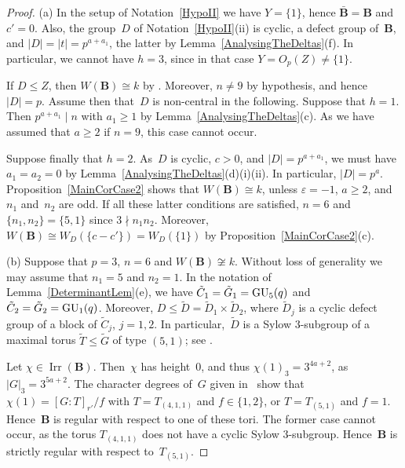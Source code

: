 \documentclass[12pt]{amsart}
\newcommand{\bB}{{\mathbf{B}}}
\def\GU{ \text{\rm GU} }
\DeclareMathOperator{\Irr}{Irr}
\theoremstyle{theorem}
\theoremstyle{definition}
\theoremstyle{remark}
\begin{document}
\begin{proof}
(a) In the setup of Notation~\ref{HypoII} we have $Y = \{ 1 \}$, hence
$\bar{\bB} = \bB$ and  $c' = 0$. Also, the group~$D$ of 
Notation~\ref{HypoII}(ii) is cyclic, a defect group of~$\bB$, and 
$|D| = |t| = p^{a+a_1}$, the latter by Lemma~\ref{AnalysingTheDeltas}(f). 
In particular, we cannot have $h = 3$, since in that case $Y = O_p( Z ) 
\neq \{ 1 \}$.

If $D \leq Z$, then $W( \bB ) \cong k$ by \cite[Lemma~$3.6$(b)]{HL24}. 
Moreover, $n \neq 9$ by hypothesis, and hence $|D| = p$. Assume then 
that~$D$ is non-central in the following. Suppose that $h = 1$. Then 
$p^{a+a_1} \mid n$ with $a_1 \geq 1$ by Lemma~\ref{AnalysingTheDeltas}(c).
As we have assumed that $a \geq 2$ if $n = 9$, this case cannot occur.

Suppose finally that $h = 2$. As~$D$ is cyclic, $c > 0$, and $|D| = p^{a+a_1}$, 
we must have $a_1 = a_2 = 0$ by Lemma~\ref{AnalysingTheDeltas}(d)(i)(ii). In
particular, $|D| = p^a$. Proposition~\ref{MainCorCase2} shows that 
$W( \bB ) \cong k$, unless $\varepsilon = -1$, $a \geq 2$, and~$n_1$ and~$n_2$ 
are odd.  If all these latter conditions are satisfied, $n = 6$ and 
$\{ n_1, n_2 \} = \{ 5, 1 \}$ since $3 \nmid n_1n_2$. Moreover,
$W( \bB ) \cong W_D( \{ c - c' \} ) = W_D( \{ 1 \} )$ by 
Proposition~\ref{MainCorCase2}(c).

(b) Suppose that $p = 3$, $n = 6$ and $W( \bB ) \not\cong k$. Without loss of
generality we may assume that $n_1 = 5$ and $n_2 = 1$. In the notation of
Lemma~\ref{DeterminantLem}(e), we have
$\tilde{C}_1 = \tilde{G}_1 = \GU_5( q )$ and
$\tilde{C}_2 = \tilde{G}_2 = \GU_1( q )$. Moreover, $D \leq \tilde{D} =
\tilde{D}_1 \times \tilde{D}_2$, where $\tilde{D}_j$ is a cyclic defect group of
a block of $\tilde{C}_j$, $j = 1, 2$. In 
particular,~$\tilde{D}$ is a Sylow $3$-subgroup of a maximal torus 
$\tilde{T} \leq \tilde{G}$ of type $(5,1)$; see \cite[Corollary~$3.6.2$]{HL25}. 

Let $\chi \in \Irr( \bB )$. Then~$\chi$ has height~$0$, and thus $\chi(1)_3 = 
3^{4a + 2}$, as $|G|_3 = 3^{5a+2}$. The character degrees of~$G$ given 
in~\cite{LL2} show that $\chi(1) = [G\colon\!T]_{r'}/f$ with $T = T_{(4,1,1)}$ 
and $f \in \{1,2\}$, or $T = T_{(5,1)}$ and $f = 1$. Hence~$\bB$ is regular
with respect to one of these tori. The former case cannot occur, as the torus 
$T_{(4,1,1)}$ does not have a cyclic Sylow $3$-subgroup. Hence~$\bB$ is strictly
regular with respect to~$T_{(5,1)}$.
\end{proof}
\end{document}
